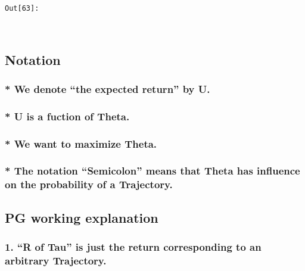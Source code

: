 \documentclass[11pt]{article}
\begin{document}
\texttt{\color{outcolor}Out[{\color{outcolor}63}]:}
    
    \begin{center}
    \end{center}
    { \hspace*{\fill} \\}
    

    \hypertarget{notation}{%
\subsection{Notation}\label{notation}}

\hypertarget{we-denote-the-expected-return-by-u.}{%
\subsubsection{* We denote ``the expected return'' by
U.}\label{we-denote-the-expected-return-by-u.}}

\hypertarget{u-is-a-fuction-of-theta.}{%
\subsubsection{* U is a fuction of
Theta.}\label{u-is-a-fuction-of-theta.}}

\hypertarget{we-want-to-maximize-theta.}{%
\subsubsection{* We want to maximize
Theta.}\label{we-want-to-maximize-theta.}}

\hypertarget{the-notation-semicolon-means-that-theta-has-influence-on-the-probability-of-a-trajectory.}{%
\subsubsection{* The notation ``Semicolon'' means that Theta has
influence on the probability of a
Trajectory.}\label{the-notation-semicolon-means-that-theta-has-influence-on-the-probability-of-a-trajectory.}}

\hypertarget{pg-working-explanation}{%
\subsection{PG working explanation}\label{pg-working-explanation}}

\hypertarget{r-of-tau-is-just-the-return-corresponding-to-an-arbitrary-trajectory.}{%
\subsubsection{1. ``R of Tau'' is just the return corresponding to an
arbitrary
Trajectory.}\label{r-of-tau-is-just-the-return-corresponding-to-an-arbitrary-trajectory.}}
\end{document}
